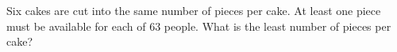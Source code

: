 Six cakes are cut into the same number of pieces per cake. At least one piece must be available for each of 63 people. What is the least number of pieces per cake?
